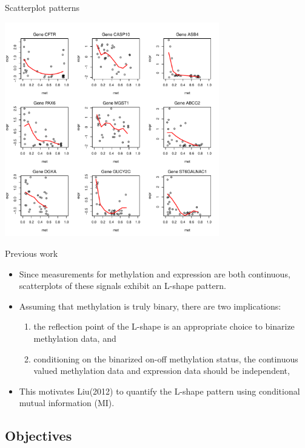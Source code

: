 \documentclass[handout]{beamer}
\begin{document}
\begin{frame}{Scatterplot patterns}
\begin{center}
\includegraphics[width=0.7\textwidth]{./images/Cluster1_Page_1.pdf}
\end{center}
\end{frame}

\begin{frame}{Previous work}
\begin{itemize}
\item Since measurements for methylation and expression are both
continuous, scatterplots of these signals exhibit an
L-shape pattern. 
\item Assuming that methylation is truly binary, there are two implications:
\begin{enumerate}
\item the reflection point of the L-shape is an appropriate choice
to binarize methylation data, and
\item conditioning on the
binarized on-off methylation status, the continuous valued
methylation data and expression data should be independent,
\end{enumerate}
\item This motivates Liu(2012) to quantify the L-shape pattern using
conditional mutual information (MI). 
\end{itemize}
\end{frame}



\subsection{Objectives}
\end{document}

